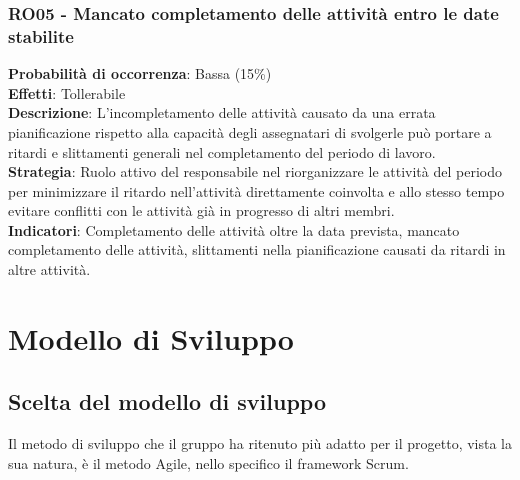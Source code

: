 \documentclass[a4paper,12pt]{article}
\begin{document}
\subsubsection{RO05 - Mancato completamento delle attività entro le date stabilite}
\label{RO05}
\textbf{Probabilità di occorrenza}: Bassa (15\%)\\
\textbf{Effetti}: Tollerabile\\
\textbf{Descrizione}: L'incompletamento delle attività causato da una errata pianificazione rispetto alla capacità degli assegnatari di svolgerle può portare a ritardi e slittamenti generali nel completamento del periodo di lavoro.\\
\textbf{Strategia}: Ruolo attivo del responsabile nel riorganizzare le attività del periodo per minimizzare il ritardo nell'attività direttamente coinvolta e allo stesso tempo evitare conflitti con le attività già in progresso di altri membri.\\
\textbf{Indicatori}: Completamento delle attività oltre la data prevista, mancato completamento delle attività, slittamenti nella pianificazione causati da ritardi in altre attività.

\section{Modello di Sviluppo}

\subsection{Scelta del modello di sviluppo}
Il metodo di sviluppo che il gruppo ha ritenuto più adatto per il progetto, vista la sua natura, è il metodo Agile, nello specifico il framework Scrum.
\end{document}

